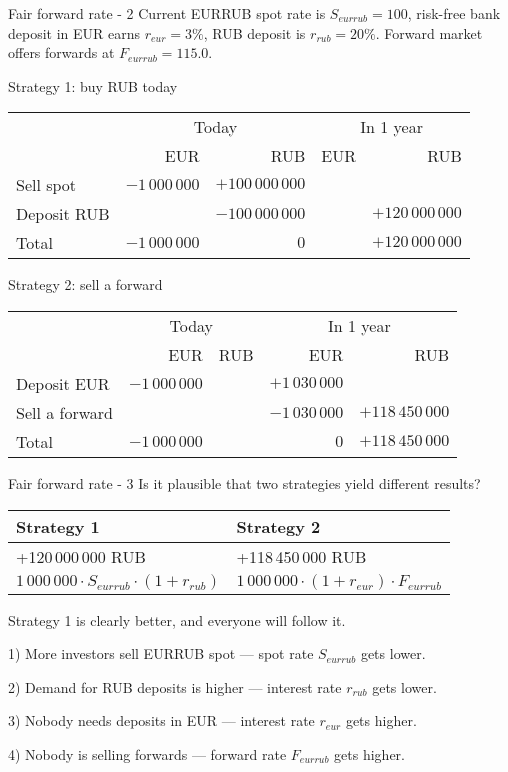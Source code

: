 \documentclass{beamer}
\begin{document}
\begin{frame}{Fair forward rate - 2}
\justify
Current EURRUB spot rate is $S_{eurrub}=100$, risk-free bank deposit in EUR earns $r_{eur}=3\%$, RUB deposit is $r_{rub}=20\%$. 
Forward market offers forwards at $F_{eurrub}=115.0$.

\justify
Strategy 1: buy RUB today

\centering
\begin{tabular}{l|r|r|r|r}
& \multicolumn{2}{c|}{Today} & \multicolumn{2}{c}{In 1 year} \\ \cline{2-5}
& EUR & RUB & EUR & RUB \\ \hline
Sell spot & $-1\,000\,000$ & $+100\,000\,000$ & & \\
Deposit RUB & & $-100\,000\,000$ & & $+120\,000\,000$ \\ \hline
Total & $-1\,000\,000$ & $0$ & & $+120\,000\,000$
\end{tabular}

\justify
Strategy 2: sell a forward

\centering
\begin{tabular}{l|r|r|r|r}
& \multicolumn{2}{c|}{Today} & \multicolumn{2}{c}{In 1 year} \\ \cline{2-5}
& EUR & RUB & EUR & RUB \\ \hline
Deposit EUR & $-1\,000\,000$ & & $+1\,030\,000$ & \\
Sell a forward &   &   & $-1\,030\,000$ & $+118\,450\,000$ \\ \hline
Total & $-1\,000\,000$ &   & $0$ & $+118\,450\,000$
\end{tabular}

\end{frame}



\begin{frame}{Fair forward rate - 3}
\justify
Is it plausible that two strategies yield different results?

\justify
\centering
\begin{tabular}{l|l}
Strategy 1 & Strategy 2 \\ \hline
+120\,000\,000 RUB  & +118\,450\,000 RUB \\
$1\,000\,000 \cdot S_{eurrub} \cdot (1+r_{rub})$ & $1\,000\,000 \cdot (1+r_{eur}) \cdot F_{eurrub}$
\end{tabular}

\justify
Strategy 1 is clearly better, and everyone will follow it. 

1) More investors sell EURRUB spot --- spot rate $S_{eurrub}$ gets lower.

2) Demand for RUB deposits is higher --- interest rate $r_{rub}$ gets lower.

3) Nobody needs deposits in EUR --- interest rate $r_{eur}$ gets higher. 

4) Nobody is selling forwards --- forward rate $F_{eurrub}$ gets higher.
\end{frame}
\end{document}

